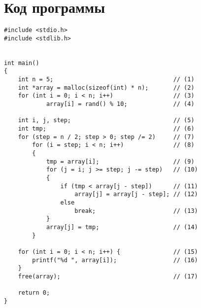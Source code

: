 \setcounter{page}{2}
\chapter{Код программы}

\captionsetup{singlelinecheck = false, justification=raggedright}
\begin{lstlisting}[label=code, caption=Сортировка Шлелла]
#include <stdio.h>
#include <stdlib.h>


int main() 
{
    int n = 5;                                  // (1)
    int *array = malloc(sizeof(int) * n);       // (2)
    for (int i = 0; i < n; i++)                 // (3)
            array[i] = rand() % 10;             // (4)

    int i, j, step;                             // (5)
    int tmp;                                    // (6)  
    for (step = n / 2; step > 0; step /= 2)     // (7)
        for (i = step; i < n; i++)              // (8)
        {   
            tmp = array[i];                     // (9)
            for (j = i; j >= step; j -= step)   // (10)
            {
                if (tmp < array[j - step])      // (11)
                    array[j] = array[j - step]; // (12)
                else                           
                    break;                      // (13)
            }
            array[j] = tmp;                     // (14)
        }

    for (int i = 0; i < n; i++) {               // (15)
        printf("%d ", array[i]);                // (16)
    }
    free(array);                                // (17)

    return 0;
}

\end{lstlisting}
\captionsetup{singlelinecheck = false, justification=centering}